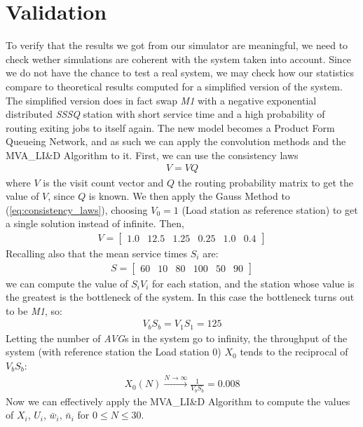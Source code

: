 \documentclass[paper=a4, fontsize=11pt]{scrartcl}
\numberwithin{equation}{section}		%
\numberwithin{figure}{section}			%
\numberwithin{table}{section}				%
\begin{document}
\section{Validation}
To verify that the results we got from our simulator are meaningful, we need to check wether simulations are coherent with the system taken into account. Since we do not have the chance to test a real system, we may check how our statistics compare to theoretical results computed for a simplified version of the system. The simplified version does in fact swap \textit{M1} with a negative exponential distributed \textit{SSSQ} station with short service time and a high probability of routing exiting jobs to itself again.
The new model becomes a Product Form Queueing Network, and as such we can apply the convolution methods and the MVA\_LI\&D Algorithm to it.
First, we can use the consistency laws
\begin{align}
V = VQ \label{eq:consistency_laws}
\end{align}
where $V$ is the visit count vector and $Q$ the routing probability matrix to get the value of $V$, since $Q$ is known. We then apply the Gauss Method to (\ref{eq:consistency_laws}), choosing $V_0 = 1$ (Load station as reference station) to get a single solution instead of infinite.
Then,
\begin{align}
V = \begin{bmatrix}1.0 & 12.5 & 1.25 & 0.25 & 1.0 & 0.4\end{bmatrix}
\end{align}
Recalling also that the mean service times $S_i$ are:
\begin{align}
S = \begin{bmatrix}60 & 10 & 80 & 100 & 50 & 90\end{bmatrix}
\end{align}
we can compute the value of $S_i V_i$ for each station, and the station whose value is the greatest is the bottleneck of the system. In this case the bottleneck turns out to be \textit{M1}, so:
\begin{align}
V_b S_b = V_1 S_1 = 125 \label{eq:VbSb}
\end{align}
Letting the number of \textit{AVG}s in the system go to infinity, the throughput of the system (with reference station the Load station 0) $X_0$ tends to the reciprocal of $V_b S_b$:
\begin{align}
X_0(N) \xrightarrow{N\to\infty} \frac{1}{V_b S_b} = 0.008
\end{align}
Now we can effectively apply the MVA\_LI\&D Algorithm to compute the values of $X_i$, $U_i$, $\bar{w}_i$, $\bar{n}_i$ for $0 \le N \le 30$.
\end{document}

